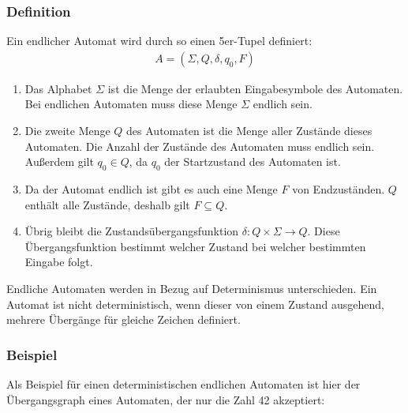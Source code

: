 \subsubsection{Definition}
\begin{flushleft}
Ein endlicher Automat wird durch so einen 5er-Tupel definiert:
\begin{align}
    A=(\Sigma,Q,\delta,q_0,F)
\end{align}

\begin{enumerate}
    \item {
        Das Alphabet $\Sigma$ ist die Menge der erlaubten Eingabesymbole des Automaten.
        Bei endlichen Automaten muss diese Menge $\Sigma$ endlich sein.
    }
    \item {
        Die zweite Menge $Q$ des Automaten ist die Menge aller Zustände dieses
        Automaten.
        Die Anzahl der Zustände des Automaten muss endlich sein.
        Außerdem gilt $q_0 \in Q$, da $q_0$ der Startzustand des Automaten ist.
    }
    \item {
        Da der Automat endlich ist gibt es auch eine Menge $F$ von Endzuständen.
        $Q$ enthält alle Zustände, deshalb gilt $F \subseteq Q$.
    }
    \item {
        Übrig bleibt die Zustandsübergangsfunktion
        $\delta: Q \times \Sigma \rightarrow Q$.
        Diese Übergangsfunktion bestimmt welcher Zustand
        bei welcher bestimmten Eingabe folgt.
    }
\end{enumerate}

Endliche Automaten werden in Bezug auf Determinismus unterschieden.
Ein Automat ist nicht deterministisch, wenn dieser von einem Zustand ausgehend,
mehrere Übergänge für gleiche Zeichen definiert.
\end{flushleft}

\subsubsection{Beispiel}
\label{sec:Beispiel}
\begin{flushleft}
Als Beispiel für einen deterministischen endlichen Automaten ist hier
der Übergangsgraph eines Automaten, der nur die Zahl 42 akzeptiert:
\end{flushleft}

\begin{center}
\end{center}


